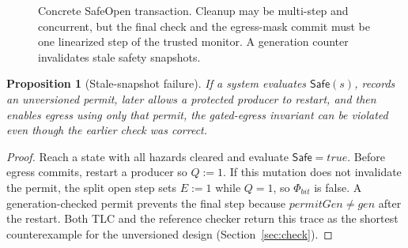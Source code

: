\documentclass[11pt,letterpaper]{article}
\theoremstyle{plain}
\newtheorem{proposition}{Proposition}
\theoremstyle{definition}
\newcommand{\HR}{\mathsf{HighReach}}
\newcommand{\Safe}{\mathsf{Safe}}
\newcommand{\Commit}{\mathsf{Commit}}
\begin{document}
\begin{figure}[t]
\centering
{}
\caption{Concrete SafeOpen transaction. Cleanup may be multi-step and concurrent, but the final check and the egress-mask commit must be one linearized step of the trusted monitor. A generation counter invalidates stale safety snapshots.}
\label{fig:safeopen}
\end{figure}

\begin{proposition}[Stale-snapshot failure]\label{prop:stale}
If a system evaluates $\Safe(s)$, records an unversioned permit, later allows a protected producer to restart, and then enables egress using only that permit, the gated-egress invariant can be violated even though the earlier check was correct.
\end{proposition}
\begin{proof}
Reach a state with all hazards cleared and evaluate $\Safe = \mathit{true}$. Before egress commits, restart a producer so $Q := 1$. If this mutation does not invalidate the permit, the split open step sets $E := 1$ while $Q = 1$, so $\Phi_{bit}$ is false. A generation-checked permit prevents the final step because $\mathit{permitGen} \neq \mathit{gen}$ after the restart. Both TLC and the reference checker return this trace as the shortest counterexample for the unversioned design (Section~\ref{sec:check}).
\end{proof}
\end{document}
